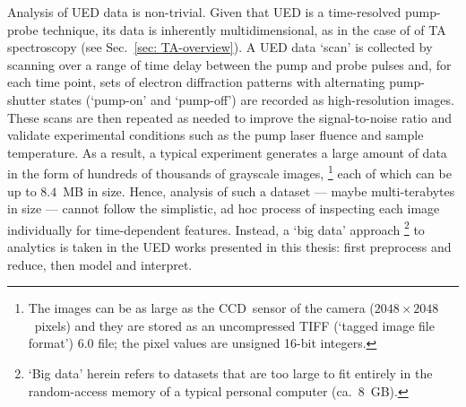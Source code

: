 Analysis of UED data is non-trivial.
%
Given that UED is a time-resolved pump-probe technique,
its data is inherently multidimensional, as in the case of of TA spectroscopy
(see Sec.~\ref{sec: TA-overview}).
A UED data `scan' is collected by scanning over a range of time delay
between the pump and probe pulses and,
for each time point, sets of electron diffraction patterns with alternating pump-shutter states
(`pump-on' and `pump-off') are recorded as high-resolution images.
These scans are then repeated as needed to improve the signal-to-noise ratio
and validate experimental conditions such as the pump laser fluence and sample temperature.
%
As a result, a typical experiment generates a large amount of data
in the form of hundreds of thousands of grayscale images,%
\footnote{
The images can be as large as the CCD~sensor of the camera ($2048 \times 2048$~pixels)
and they are stored as an uncompressed TIFF (`tagged image file format') 6.0 file;
the pixel values are unsigned 16-bit integers.}
%
each of which can be up to $8.4$~MB in size.
%
Hence, analysis of such a dataset --- maybe multi-terabytes in size ---
cannot follow the simplistic, ad hoc process of inspecting each image individually
for time-dependent features.
%
Instead, a `big data' approach%
\footnote{`Big data' herein refers to datasets that are too large to
fit entirely in the random-access memory of a typical personal computer (ca.~$8$~GB).}
to analytics is taken in the UED works presented in this thesis:
first preprocess and reduce, then model and interpret.

